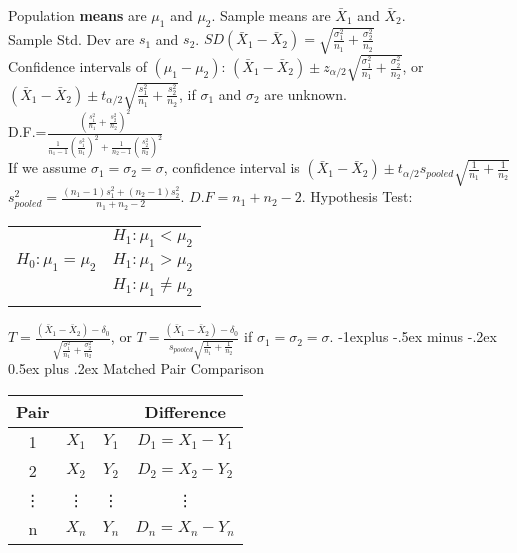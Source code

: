 \documentclass[10pt,landscape]{article}
\makeatletter
\renewcommand{\subsection}{\@startsection{subsection}{2}{0mm}%
                                {-1explus -.5ex minus -.2ex}%
                                {0.5ex plus .2ex}%
                                {\normalfont\normalsize\bfseries}}
\makeatother
\begin{document}
\begin{multicols*}{3}
	\vspace{2em}
Population\textbf{ means} are $\mu_1$ and $\mu_2$. Sample means are $\bar{X}_1$ and $\bar{X}_2$.\\
Sample Std. Dev are $s_1$ and $s_2$. $SD(\bar{X}_1-\bar{X}_2)=\sqrt{\frac{\sigma_1^2}{n_1}+\frac{\sigma_2^2}{n_2}}$\\
Confidence intervals of $(\mu_1-\mu_2)$: $(\bar{X}_1-\bar{X}_2)\pm z_{\alpha/2}\sqrt{\frac{\sigma_1^2}{n_1}+\frac{\sigma_2^2}{n_2}}$, or $(\bar{X}_1-\bar{X}_2)\pm t_{\alpha/2}\sqrt{\frac{s_1^2}{n_1}+\frac{s_2^2}{n_2}}$, if $\sigma_1$ and $\sigma_2$ are unknown.\\
D.F.=$\displaystyle\frac{(\frac{s_1^2}{n_1}+\frac{s_2^2}{n_2})^2}{\frac{1}{n_1-1}(\frac{s_1^2}{n_1})^2+\frac{1}{n_2-1}(\frac{s_2^2}{n_2})^2}$\\
If we assume $\sigma_1=\sigma_2=\sigma$, confidence interval is $(\bar{X}_1-\bar{X}_2)\pm t_{\alpha/2}s_{pooled}\sqrt{\frac{1}{n_1}+\frac{1}{n_2}}$\\
$\displaystyle s_{pooled}^2 =\frac{(n_1-1)s_1^2+(n_2-1)s_2^2}{n_1+n_2-2}$. $\displaystyle D.F=n_1+n_2-2$.
Hypothesis Test: \\
\begin{tabular}{c c}
	\multirow{3}{*}{$H_0:\mu_1=\mu_2$} & $H_1:\mu_1<\mu_2$\\
	& $H_1:\mu_1>\mu_2$\\
	& $H_1:\mu_1\neq \mu_2$\\
	&\\
\end{tabular}

$\displaystyle T=\frac{(\bar{X}_1-\bar{X}_2)-\delta_0}{\sqrt{\frac{\sigma_1^2}{n_1}+\frac{\sigma_2^2}{n_2}}}$, or $\displaystyle T=\frac{(\bar{X}_1-\bar{X}_2)-\delta_0}{s_{pooled}\sqrt{\frac{1}{n_1}+\frac{1}{n_2}}}$ if $\sigma_1=\sigma_2=\sigma$.
\subsection{Matched Pair Comparison}
\begin{center}
\begin{tabular}{c c c c}\hline
	\centering
	Pair & & & Difference\\\hline
	1 & $X_1$ &$Y_1$& $D_1=X_1-Y_1$\\
	2 & $X_2$ &$Y_2$& $D_2=X_2-Y_2$\\
	\vdots & \vdots & \vdots &\vdots\\
	n & $X_n$ &$Y_n$& $D_n=X_n-Y_n$\\\hline
\end{tabular}
\end{center}


\end{multicols*}
\end{document}
